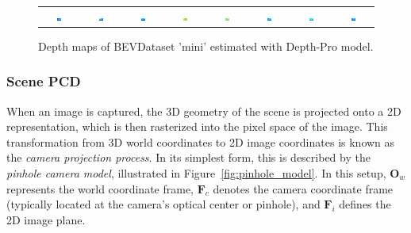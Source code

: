 \begin{figure}[h!]
\begin{tabular}{c c c c c c c c}
        \includegraphics[width=0.12\textwidth]{images/methodology/depth_images/colored_depth_map_0.png} & 
        \includegraphics[width=0.12\textwidth]{images/methodology/depth_images/colored_depth_map_1.png} & 
        \includegraphics[width=0.12\textwidth]{images/methodology/depth_images/colored_depth_map_2.png} &
        \includegraphics[width=0.12\textwidth]{images/methodology/depth_images/colored_depth_map_3.png} &
        \includegraphics[width=0.12\textwidth]{images/methodology/depth_images/colored_depth_map_4.png} &   
        \includegraphics[width=0.12\textwidth]{images/methodology/depth_images/colored_depth_map_5.png} & 
        \includegraphics[width=0.12\textwidth]{images/methodology/depth_images/colored_depth_map_6.png} &
        \includegraphics[width=0.12\textwidth]{images/methodology/depth_images/colored_depth_map_7.png} \\
    \end{tabular}    
    \caption{Depth maps of BEVDataset 'mini' estimated with Depth-Pro model.}
    \label{fig:depth_images}
\end{figure}

\subsubsection{Scene PCD}
When an image is captured, the 3D geometry of the scene is projected onto a 2D representation, which is then rasterized into the pixel space of the image. This transformation from 3D world coordinates to 2D image coordinates is known as the \emph{camera projection process}. In its simplest form, this is described by the \emph{pinhole camera model}, illustrated in Figure~\ref{fig:pinhole_model}. In this setup, $\mathbf{O}_w$ represents the world coordinate frame, $\mathbf{F}_c$ denotes the camera coordinate frame (typically located at the camera's optical center or pinhole), and $\mathbf{F}_i$ defines the 2D image plane.

